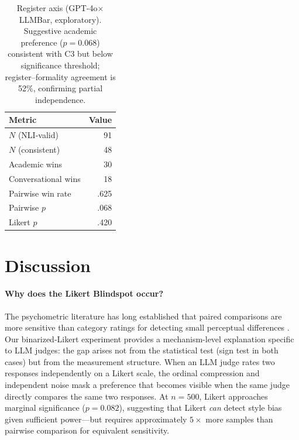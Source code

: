 \documentclass[11pt]{article}
\begin{document}
\begin{table}[t]
\centering
\small
\begin{tabular}{lr}
\toprule
\textbf{Metric} & \textbf{Value} \\
\midrule
$N$ (NLI-valid) & 91 \\
$N$ (consistent) & 48 \\
Academic wins & 30 \\
Conversational wins & 18 \\
Pairwise win rate & .625 \\
Pairwise $p$ & .068 \\
Likert $p$ & .420 \\
\bottomrule
\end{tabular}
\caption{Register axis (GPT-4o$\times$LLMBar, exploratory). Suggestive academic preference ($p = 0.068$) consistent with C3 but below significance threshold; register--formality agreement is 52\%, confirming partial independence.}
\label{tab:register}
\end{table}

\section{Discussion}

\paragraph{Why does the Likert Blindspot occur?}
The psychometric literature has long established that paired comparisons are more sensitive than category ratings for detecting small perceptual differences \cite{thurstone1927law,kiritchenko2017bestworstscaling,novikova2018rankme}.
Our binarized-Likert experiment provides a mechanism-level explanation specific to LLM judges: the gap arises not from the statistical test (sign test in both cases) but from the measurement structure.
When an LLM judge rates two responses independently on a Likert scale, the ordinal compression and independent noise mask a preference that becomes visible when the same judge directly compares the same two responses.
At $n = 500$, Likert approaches marginal significance ($p = 0.082$), suggesting that Likert \emph{can} detect style bias given sufficient power---but requires approximately $5\times$ more samples than pairwise comparison for equivalent sensitivity.
\end{document}
